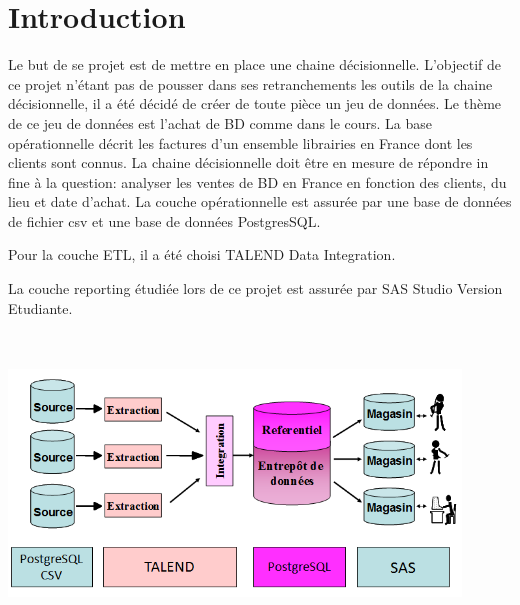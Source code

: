 \chapter{Introduction}

Le but de se projet est de mettre en place une chaine décisionnelle. L'objectif de ce projet n'étant pas de pousser dans ses retranchements les outils de la chaine décisionnelle, il a été décidé de créer de toute pièce un jeu de données. Le thème de ce jeu de données est l'achat de BD comme dans le cours. 
La base opérationnelle décrit les factures d'un ensemble librairies en France dont les clients sont connus.
La chaine décisionnelle doit être en mesure de répondre in fine à la question: analyser les ventes de BD en France en fonction des clients, du lieu et date d'achat.
La couche opérationnelle est assurée par une base de données de fichier csv et une base de données PostgresSQL. 

Pour la couche ETL, il a été choisi TALEND Data Integration. 

La couche reporting étudiée lors de ce projet est assurée par SAS Studio Version Etudiante.


\includegraphics[clip=true, width=120mm, height=80mm]{images/chaine.png} 
\label{chaine}



\clearpage
